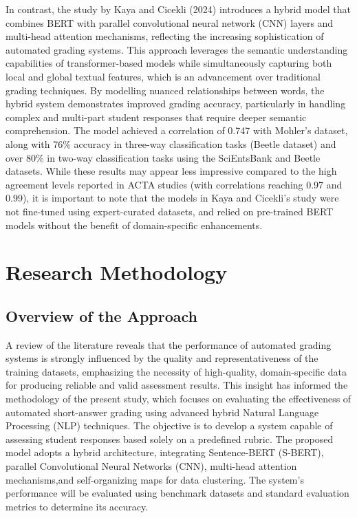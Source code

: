 \documentclass[a4paper,10pt]{article}
\begin{document}
In contrast, the study by Kaya and Cicekli (2024) introduces a hybrid model that combines BERT with parallel convolutional neural network (CNN) layers and multi-head attention mechanisms, reflecting the increasing sophistication of automated grading systems\cite{kaya2024hybrid}. This approach leverages the semantic understanding capabilities of transformer-based models while simultaneously capturing both local and global textual features, which is an advancement over traditional grading techniques\cite{kaya2024hybrid}. By modelling nuanced relationships between words, the hybrid system demonstrates improved grading accuracy, particularly in handling complex and multi-part student responses that require deeper semantic comprehension\cite{kaya2024hybrid}. The model achieved a correlation of 0.747 with Mohler’s dataset, along with 76\% accuracy in three-way classification tasks (Beetle dataset) and over 80\% in two-way classification tasks using the SciEntsBank and Beetle datasets\cite{kaya2024hybrid}. While these results may appear less impressive compared to the high agreement levels reported in ACTA studies (with correlations reaching 0.97 and 0.99), it is important to note that the models in Kaya and Cicekli’s study were not fine-tuned using expert-curated datasets, and relied on pre-trained BERT models without the benefit of domain-specific enhancements\cite{kaya2024hybrid}.\newline\newline

\section{Research Methodology}

\subsection{Overview of the Approach}
A review of the literature reveals that the performance of automated grading systems is strongly influenced by the quality and representativeness of the training datasets, emphasizing the necessity of high-quality, domain-specific data for producing reliable and valid assessment results. This insight has informed the methodology of the present study, which focuses on evaluating the effectiveness of automated short-answer grading using advanced hybrid Natural Language Processing (NLP) techniques. The objective is to develop a system capable of assessing student responses based solely on a predefined rubric. The proposed model adopts a hybrid architecture, integrating Sentence-BERT (S-BERT), parallel Convolutional Neural Networks (CNN), multi-head attention mechanisms,and self-organizing maps for data clustering. The system’s performance will be evaluated using benchmark datasets and standard evaluation metrics to determine its accuracy.
\end{document}
